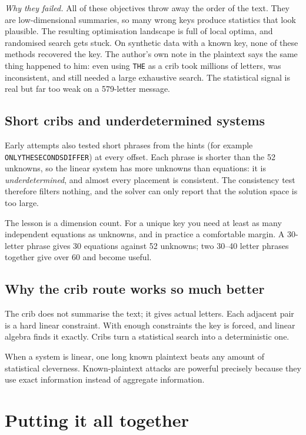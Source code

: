 \documentclass[11pt]{article}
\begin{document}
\emph{Why they failed.}  All of these objectives throw away the order of the
text.  They are low-dimensional summaries, so many wrong keys produce
statistics that look plausible.  The resulting optimisation landscape is full
of local optima, and randomised search gets stuck.  On synthetic data with a
known key, none of these methods recovered the key.  The author's own note in
the plaintext says the same thing happened to him: even using \texttt{THE} as a
crib took millions of letters, was inconsistent, and still needed a large
exhaustive search.  The statistical signal is real but far too weak on a
579-letter message.

\subsection{Short cribs and underdetermined systems}

Early attempts also tested short phrases from the hints (for example
\texttt{ONLYTHESECONDSDIFFER}) at every offset.  Each phrase is shorter than
the 52 unknowns, so the linear system has more unknowns than equations: it is
\emph{underdetermined}, and almost every placement is consistent.  The
consistency test therefore filters nothing, and the solver can only report
that the solution space is too large.

The lesson is a dimension count.  For a unique key you need at least as many
independent equations as unknowns, and in practice a comfortable margin.  A
30-letter phrase gives 30 equations against 52 unknowns; two 30--40 letter
phrases together give over 60 and become useful.

\subsection{Why the crib route works so much better}

The crib does not summarise the text; it gives actual letters.  Each adjacent
pair is a hard linear constraint.  With enough constraints the key is forced,
and linear algebra finds it exactly.  Cribs turn a statistical search into a
deterministic one.

\begin{lesson}
When a system is linear, one long known plaintext beats any amount of
statistical cleverness.  Known-plaintext attacks are powerful precisely
because they use exact information instead of aggregate information.
\end{lesson}

\section{Putting it all together}\label{sec:all}
\end{document}
